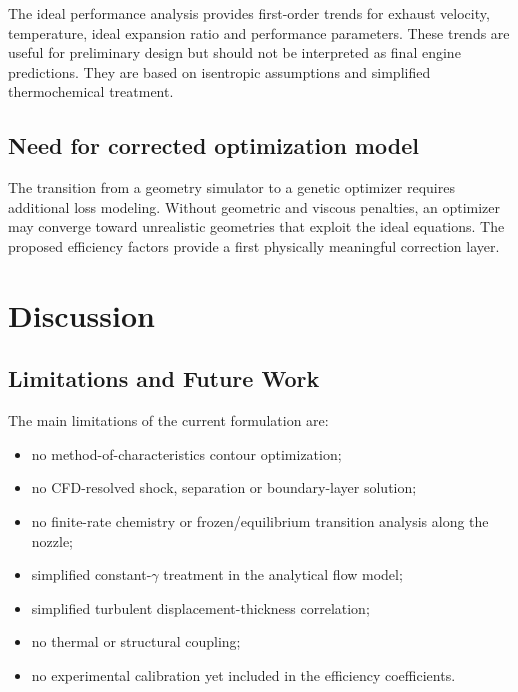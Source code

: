 \documentclass[journal,article,submit,oneauthor]{Definitions/mdpi}
\begin{document}
The ideal performance analysis provides first-order trends for exhaust velocity, temperature, ideal expansion ratio and performance parameters. These trends are useful for preliminary design but should not be interpreted as final engine predictions. They are based on isentropic assumptions and simplified thermochemical treatment.

\subsection{Need for corrected optimization model}

The transition from a geometry simulator to a genetic optimizer requires additional loss modeling. Without geometric and viscous penalties, an optimizer may converge toward unrealistic geometries that exploit the ideal equations. The proposed efficiency factors provide a first physically meaningful correction layer.

\section{Discussion}

\subsection{Limitations and Future Work}

The main limitations of the current formulation are:
\begin{itemize}
    \item no method-of-characteristics contour optimization;
    \item no CFD-resolved shock, separation or boundary-layer solution;
    \item no finite-rate chemistry or frozen/equilibrium transition analysis along the nozzle;
    \item simplified constant-$\gamma$ treatment in the analytical flow model;
    \item simplified turbulent displacement-thickness correlation;
    \item no thermal or structural coupling;
    \item no experimental calibration yet included in the efficiency coefficients.
\end{itemize}
\end{document}
